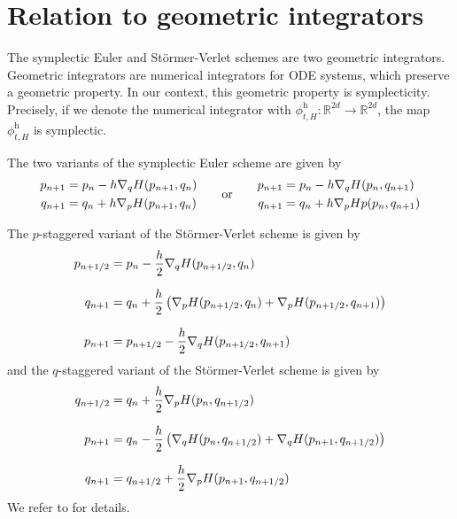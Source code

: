\documentclass[twoside,a4paper]{article}
\begin{document}
\section{Relation to geometric integrators}

The symplectic Euler and Störmer-Verlet schemes are two geometric integrators. Geometric integrators
are numerical integrators for ODE systems, which preserve a geometric property. In our context,
this geometric property is symplecticity. Precisely, if we denote the numerical integrator with
$\phi^{\text{h}}_{t,H} : \mathbb{R}^{2d} \to \mathbb{R}^{2d}$, the map $\phi^{\text{h}}_{t,H}$ is
symplectic.

The two variants of the symplectic Euler scheme are given by
\begin{equation*}
	\begin{split}
			p_{n+1} &= p_n - h \grad[q]{H} (p_{n+1}, q_n) \\
			q_{n+1} &= q_n + h \grad[p]{H}(p_{n+1}, q_n)	
	\end{split}
	\quad\quad \text{or} \quad\quad
	\begin{split}
			p_{n+1} &= p_n - h \grad[q]{H}(p_n, q_{n+1}) \\
			q_{n+1} &= q_n + h \grad[p]{H}{p}(p_n, q_{n+1})	
	\end{split}
\end{equation*}

The $p$-staggered variant of the Störmer-Verlet scheme is given by
\begin{align*}
	p_{n+1/2} &= p_n - \frac{h}{2} \grad[q]{H}(p_{n+1/2}, q_n) \\[7pt]
	q_{n+1} &= q_n + \frac{h}{2} \lb \grad[p]{H}(p_{n+1/2}, q_n) + \grad[p]{H}(p_{n+1/2}, q_{n+1}) \rb \\[7pt]
	p_{n+1} &= p_{n+1/2} - \frac{h}{2} \grad[q]{H}(p_{n+1/2}, q_{n+1})
\end{align*}
and the $q$-staggered variant of the Störmer-Verlet scheme is given by
\begin{align*}
	q_{n+1/2} &= q_n + \frac{h}{2} \grad[p]{H}(p_n, q_{n+1/2}) \\[7pt]
	p_{n+1} &= q_n - \frac{h}{2} \lb \grad[q]{H}(p_n, q_{n+1/2}) + \grad[q]{H}(p_{n+1}, q_{n+1/2}) \rb \\[7pt]
	q_{n+1} &= q_{n+1/2} + \frac{h}{2} \grad[p]{H}(p_{n+1}, q_{n+1/2})
\end{align*}
We refer to \citet[p.~189 and p.~190]{hairer2006} for details.
\end{document}
